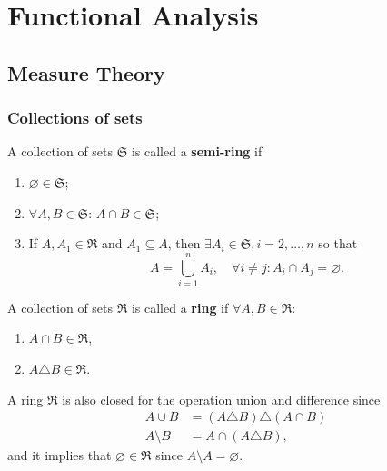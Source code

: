 \section{Functional Analysis}

\subsection{Measure Theory}

\subsubsection{Collections of sets}

\begin{definition}
A collection of sets $\mathfrak{S}$ is called a \textbf{semi-ring} if
\begin{enumerate}
\item $\varnothing\in\mathfrak{S}$;
\item $\forall A,B\in\mathfrak{S}:\,A\cap B\in\mathfrak{S}$;
\item If $A, A_1\in\mathfrak{R}$ and $A_1\subseteq A$, then $\exists A_i\in\mathfrak{S},i=2,\dots,n$ so that
\begin{equation}
A=\bigcup^n_{i=1} A_i,\quad \forall i\ne j:A_i\cap A_j=\varnothing.
\end{equation} 
\end{enumerate}
\end{definition}


\begin{definition}
A collection of sets $\mathfrak{R}$ is called a \textbf{ring} if $\forall A,B\in\mathfrak{R}$:
\begin{enumerate}
\item $A\cap B\in\mathfrak{R}$,
\item $A\triangle B\in\mathfrak{R}$.
\end{enumerate}
\end{definition}

A ring $\mathfrak{R}$ is also closed for the operation union and difference since
\begin{equation}
\begin{aligned}
A\cup B&=(A\triangle B)\triangle(A\cap B)\\
A\setminus B&=A\cap(A\triangle B),
\end{aligned}
\end{equation}
and it implies that $\varnothing\in\mathfrak{R}$ since $A\setminus A=\varnothing$.

